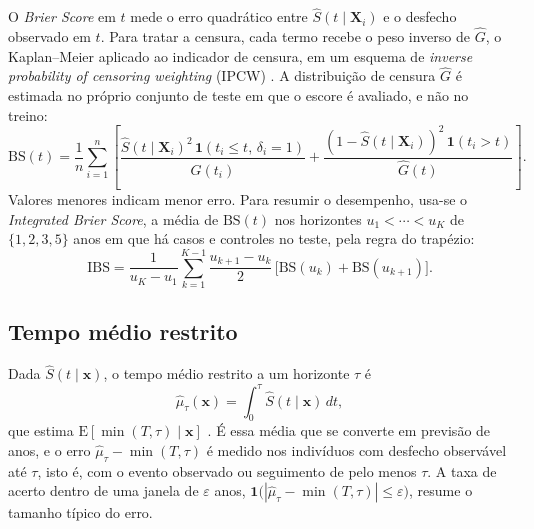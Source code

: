 O \textit{Brier Score} em $t$ mede o erro quadrático entre $\hat{S}(t \mid \mathbf{X}_i)$ e o desfecho observado em $t$. Para tratar a censura, cada termo recebe o peso inverso de $\hat{G}$, o Kaplan--Meier aplicado ao indicador de censura, em um esquema de \textit{inverse probability of censoring weighting} (IPCW) \citep{graf1999}. A distribuição de censura $\hat{G}$ é estimada no próprio conjunto de teste em que o escore é avaliado, e não no treino:
\begin{equation}
    \mathrm{BS}(t)
    = \frac{1}{n}\sum_{i=1}^{n}
      \left[
        \frac{\hat{S}(t \mid \mathbf{X}_i)^2\,\mathbf{1}(t_i \leq t,\,\delta_i=1)}
             {\hat{G}(t_i)}
        +
        \frac{\left(1 - \hat{S}(t \mid \mathbf{X}_i)\right)^2\,\mathbf{1}(t_i > t)}
             {\hat{G}(t)}
      \right].
    \label{eq:brier}
\end{equation}
Valores menores indicam menor erro. Para resumir o desempenho, usa-se o \textit{Integrated Brier Score}, a média de $\mathrm{BS}(t)$ nos horizontes $u_1 < \cdots < u_K$ de $\{1, 2, 3, 5\}$ anos em que há casos e controles no teste, pela regra do trapézio:
\begin{equation}
    \mathrm{IBS} = \frac{1}{u_K - u_1} \sum_{k=1}^{K-1} \frac{u_{k+1} - u_k}{2}\,\bigl[\mathrm{BS}(u_k) + \mathrm{BS}(u_{k+1})\bigr].
    \label{eq:ibs}
\end{equation}

    \subsection{Tempo médio restrito}
    \label{subsec:tempo_esperado}

Dada $\hat{S}(t \mid \mathbf{x})$, o tempo médio restrito a um horizonte $\tau$ é
\begin{equation}
  \hat{\mu}_\tau(\mathbf{x}) = \int_{0}^{\tau} \hat{S}(t \mid \mathbf{x})\,dt,
  \label{eq:rmst}
\end{equation}
que estima $\mathrm{E}[\min(T, \tau) \mid \mathbf{x}]$ \citep{royston2013}. É essa média que se converte em previsão de anos, e o erro $\hat{\mu}_\tau - \min(T,\tau)$ é medido nos indivíduos com desfecho observável até $\tau$, isto é, com o evento observado ou seguimento de pelo menos $\tau$. A taxa de acerto dentro de uma janela de $\varepsilon$ anos, $\mathbf{1}\bigl(|\hat{\mu}_\tau - \min(T,\tau)| \le \varepsilon\bigr)$, resume o tamanho típico do erro.

